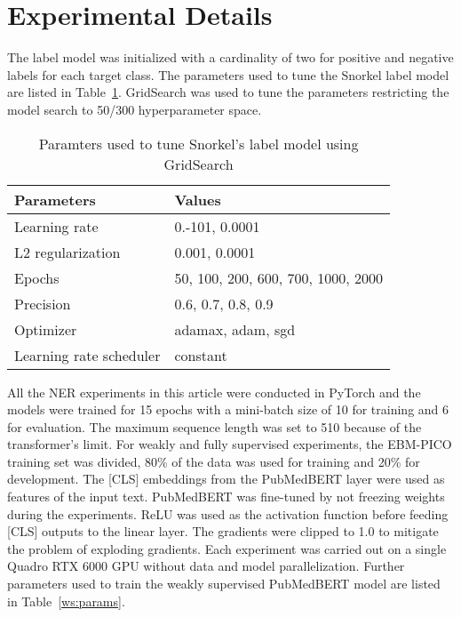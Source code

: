 \documentclass[10.7pt,]{article}
\begin{document}
\section{Experimental Details}\label{params}
%
The label model was initialized with a cardinality of two for positive and negative labels for each target class. 
The parameters used to tune the Snorkel label model are listed in Table~\ref{lm:params}.
GridSearch was used to tune the parameters restricting the model search to 50/300 hyperparameter space.
%
\begin{table}[ht]
\centering
\begin{tabular}{|l|l|}
\hline
Parameters               & Values                              \\
\hline
Learning rate           & 0.-101, 0.0001                      \\
L2 regularization       & 0.001, 0.0001                      \\
Epochs                  & 50, 100, 200, 600, 700, 1000, 2000 \\
Precision               & 0.6, 0.7, 0.8, 0.9                 \\
Optimizer               & adamax, adam, sgd                  \\
Learning rate scheduler & constant                           \\
\hline
\end{tabular}
\caption{\label{lm:params} Paramters used to tune Snorkel's label model using GridSearch}
\end{table}
% 
%
%
All the NER experiments in this article were conducted in PyTorch and the models were trained for 15 epochs with a mini-batch size of 10 for training and 6 for evaluation.
The maximum sequence length was set to 510 because of the transformer's limit.
For weakly and fully supervised experiments, the EBM-PICO training set was divided, 80\% of the data was used for training and 20\% for development.
The [CLS] embeddings from the PubMedBERT layer were used as features of the input text.
PubMedBERT was fine-tuned by not freezing weights during the experiments.
ReLU was used as the activation function before feeding [CLS] outputs to the linear layer.
The gradients were clipped to 1.0 to mitigate the problem of exploding gradients.
Each experiment was carried out on a single Quadro RTX 6000 GPU without data and model parallelization.
Further parameters used to train the weakly supervised PubMedBERT model are listed in Table~\ref{ws:params}.
%
\end{document}
